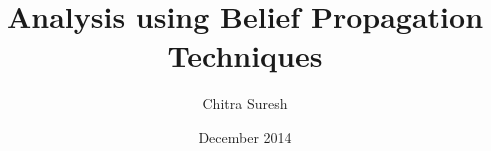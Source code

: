 \clearpage%

\title{ Analysis using Belief Propagation Techniques }
\author{Chitra Suresh}

\date{December 2014}



\maketitle

